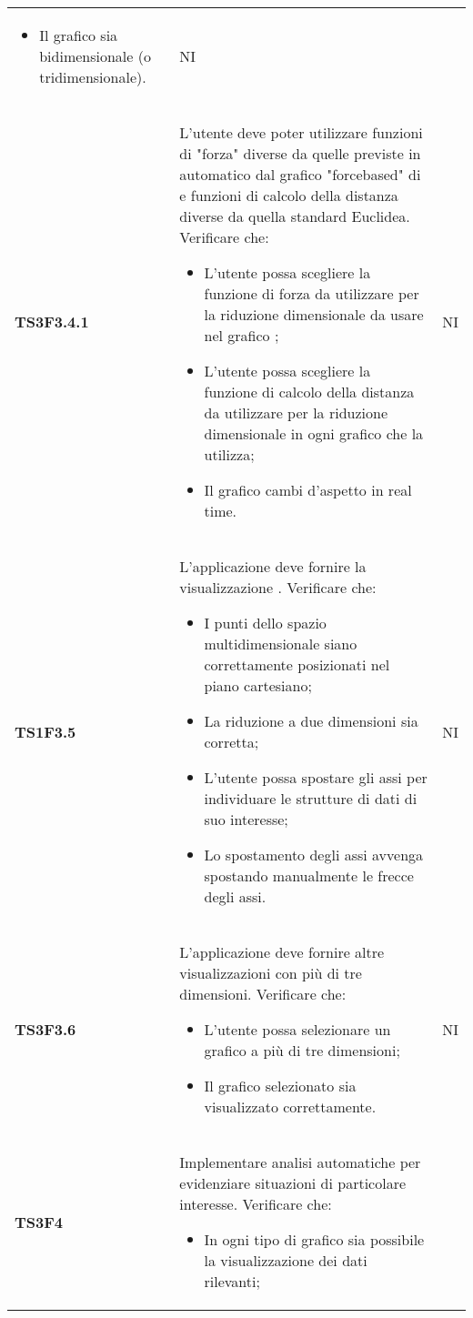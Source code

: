 \begin{longtable}{C{2cm} C{12cm} C{1.5cm}}
\begin{itemize}
						\item Il grafico sia bidimensionale (o tridimensionale).
					\end{itemize}	
				 & NI \\
\textbf{TS3F3.4.1} & L'utente deve poter utilizzare funzioni di "forza" diverse da quelle previste in automatico dal grafico "forcebased" di  e funzioni di calcolo della distanza diverse da quella standard Euclidea. Verificare che:
					\begin{itemize}
						\item L'utente possa scegliere la funzione di forza da utilizzare per la riduzione dimensionale da usare nel grafico ;
						\item L'utente possa scegliere la funzione di calcolo della distanza da utilizzare per la riduzione dimensionale in ogni grafico che la utilizza;
						\item Il grafico cambi d'aspetto in real time.
					\end{itemize}
				   & NI \\
\textbf{TS1F3.5} & L'applicazione deve fornire la visualizzazione . Verificare che:
					\begin{itemize}
						\item I punti dello spazio multidimensionale siano correttamente posizionati nel piano cartesiano;
						\item La riduzione a due dimensioni sia corretta;
						\item L'utente possa spostare gli assi per individuare le strutture di dati di suo interesse;
						\item Lo spostamento degli assi avvenga spostando manualmente le frecce degli assi.
					\end{itemize}	
				   & NI \\
\textbf{TS3F3.6} & L'applicazione deve fornire altre visualizzazioni con più di tre dimensioni. Verificare che:
					\begin{itemize}
						\item L'utente possa selezionare un grafico a più di tre dimensioni;
						\item Il grafico selezionato sia visualizzato correttamente.
					\end{itemize}	
				   & NI \\
\textbf{TS3F4} & Implementare analisi automatiche per evidenziare situazioni di particolare interesse. Verificare che: 
					\begin{itemize}
						\item In ogni tipo di grafico sia possibile la visualizzazione dei dati rilevanti;

\end{itemize}
\end{longtable}
